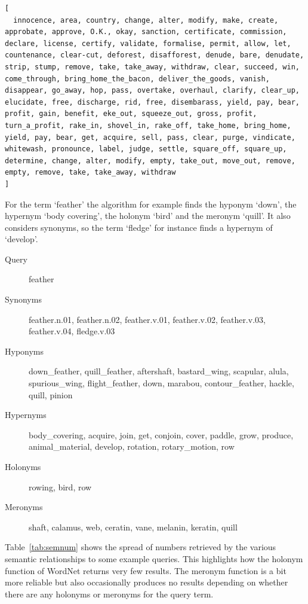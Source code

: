 \clearpage

\begin{verbatim}
[
  innocence, area, country, change, alter, modify, make, create, approbate, approve, O.K., okay, sanction, certificate, commission, declare, license, certify, validate, formalise, permit, allow, let, countenance, clear-cut, deforest, disafforest, denude, bare, denudate, strip, stump, remove, take, take_away, withdraw, clear, succeed, win, come_through, bring_home_the_bacon, deliver_the_goods, vanish, disappear, go_away, hop, pass, overtake, overhaul, clarify, clear_up, elucidate, free, discharge, rid, free, disembarass, yield, pay, bear, profit, gain, benefit, eke_out, squeeze_out, gross, profit, turn_a_profit, rake_in, shovel_in, rake_off, take_home, bring_home, yield, pay, bear, get, acquire, sell, pass, clear, purge, vindicate, whitewash, pronounce, label, judge, settle, square_off, square_up, determine, change, alter, modify, empty, take_out, move_out, remove, empty, remove, take, take_away, withdraw
]
\end{verbatim}

For the term `feather' the algorithm for example finds the hyponym `down', the hypernym `body covering', the holonym `bird' and the meronym `quill'. It also considers synonyms, so the term `fledge' for instance finds a hypernym of `develop'.

\begin{description}
  \item[Query] feather 
  \item[Synonyms] feather.n.01, feather.n.02, feather.v.01, feather.v.02, feather.v.03, feather.v.04, fledge.v.03
  \item[Hyponyms] down\_feather, quill\_feather, aftershaft, bastard\_wing, scapular, alula, spurious\_wing, flight\_feather, down, marabou, contour\_feather, hackle, quill, pinion
  \item[Hypernyms] body\_covering, acquire, join, get, conjoin, cover, paddle, grow, produce, animal\_material, develop, rotation, rotary\_motion, row
  \item[Holonyms] rowing, bird, row
  \item[Meronyms] shaft, calamus, web, ceratin, vane, melanin, keratin, quill
\end{description}

Table~\ref{tab:semnum} shows the spread of numbers retrieved by the various semantic relationships to some example queries. This highlights how the holonym function of WordNet returns very few results. The meronym function is a bit more reliable but also occasionally produces no results depending on whether there are any holonyms or meronyms for the query term.

